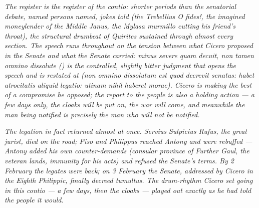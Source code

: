 \textit{The register is the register of the contio: shorter
periods than the senatorial debate, named persons named, jokes
told (the Trebellius \textit{O fides!}, the imagined moneylender
of the Middle Janus, the Mylasa murmillo cutting his friend's
throat), the structural drumbeat of \textit{Quirites} sustained
through almost every section. The speech runs throughout on the
tension between what Cicero proposed in the Senate and what the
Senate carried: \textit{minus severe quam decuit, non tamen
omnino dissolute} () is the controlled, slightly
bitter judgment that opens the speech and is restated at
 (\textit{non omnino dissolutum est quod decrevit
senatus: habet atrocitatis aliquid legatio: utinam nihil
haberet morae}). Cicero is making the best of a compromise he
opposed; the report to the people is also a holding action ---
a few days only, the cloaks will be put on, the war will come,
and meanwhile the man being notified is precisely the man who
will not be notified.}

\textit{The legation in fact returned almost at once. Servius
Sulpicius Rufus, the great jurist, died on the road; Piso and
Philippus reached Antony and were rebuffed --- Antony added his
own counter-demands (consular province of Further Gaul, the
veteran lands, immunity for his acts) and refused the Senate's
terms. By 2 February the legates were back; on 3 February the
Senate, addressed by Cicero in the Eighth Philippic, finally
decreed \textit{tumultus}. The drum-rhythm Cicero set going in
this contio --- \textit{a few days, then the cloaks} ---
played out exactly as he had told the people it would.}
